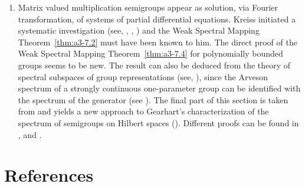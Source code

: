 \begin{enumerate}[label=\emph{Section \arabic*:}, wide, itemsep=1ex]
\item  
Matrix valued multiplication semigroups appear as solution, via Fourier transformation, of systems of partial differential equations.
Kreiss initiated a systematic investigation (see, \eg \citet{kreiss:1958}, \citet{kreiss:1959}, \citet{millerstrang:1966}) and the Weak Spectral Mapping Theorem~\ref{thm:a3-7.2} must have been known to him. 
The direct proof of the Weak Spectral Mapping Theorem~\ref{thm:a3-7.4} for polynomially bounded groups seems to be new. 
The result can also be deduced from the theory of spectral subspaces of group representations (see, \eg \citet{combesdelaroche:1978}), since the Arveson spectrum of a strongly continuous one-parameter group can be identified with the spectrum of the generator (see \citet{evans:1976}). 
The final part of this section is taken from \citet{greiner:1985} and yields a new approach to Gearhart's characterization of the spectrum of semigroups on Hilbert spaces (\citet{gearhart:1978}). 
Different proofs can be found in \citet{herbst:1983}, \citet{howland:1984} and \citet{pruess:1984}. 
\end{enumerate}

\section*{References}
{\RaggedRight
\renewcommand{\bibsection}{}

}

